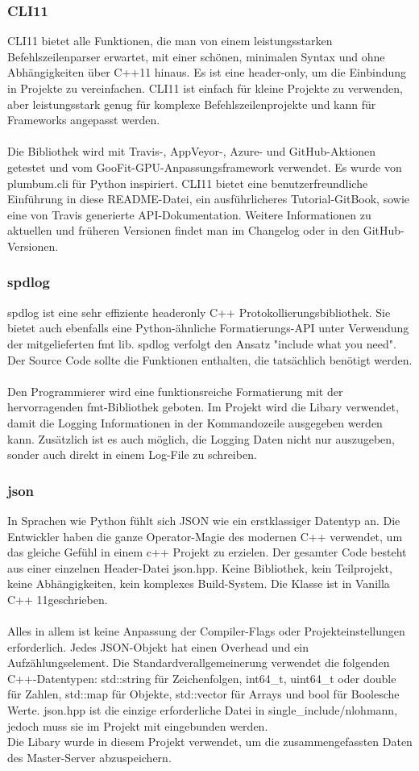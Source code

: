 \documentclass[a4paper,12pt]{article}
\begin{document}
\subsubsection{CLI11}
CLI11 bietet alle Funktionen, die man von einem leistungsstarken Befehlszeilenparser erwartet, mit einer schönen, minimalen Syntax und ohne 
Abhängigkeiten über C++11 hinaus. Es ist eine header-only, um die Einbindung in Projekte zu 
vereinfachen. CLI11 ist einfach für kleine Projekte zu verwenden, aber leistungsstark genug für komplexe Befehlszeilenprojekte und kann für Frameworks angepasst werden. \\\\
Die Bibliothek wird mit Travis-, AppVeyor-, Azure- und GitHub-Aktionen getestet und vom GooFit-GPU-Anpassungsframework verwendet. 
Es wurde von plumbum.cli für Python inspiriert. CLI11 bietet eine benutzerfreundliche Einführung in diese README-Datei, ein ausführlicheres Tutorial-GitBook, sowie eine von Travis generierte API-Dokumentation. 
Weitere Informationen zu aktuellen und früheren Versionen findet man im Changelog oder in den GitHub-Versionen.
\subsubsection{spdlog}
spdlog ist eine sehr effiziente headeronly C++ Protokollierungsbibliothek. Sie bietet auch ebenfalls eine Python-ähnliche Formatierungs-API unter Verwendung der mitgelieferten fmt lib.
spdlog verfolgt den Ansatz "include what you need". Der Source Code sollte die Funktionen enthalten, die tatsächlich benötigt werden.\\\\
Den Programmierer wird eine funktionsreiche Formatierung mit der hervorragenden fmt-Bibliothek geboten.
Im Projekt wird die Libary verwendet, damit die Logging Informationen in der Kommandozeile ausgegeben werden kann. Zusätzlich ist es auch möglich,
die Logging Daten nicht nur auszugeben, sonder auch direkt in einem Log-File zu schreiben.
\subsubsection{json}
In Sprachen wie Python fühlt sich JSON wie ein erstklassiger Datentyp an. 
Die Entwickler haben die ganze Operator-Magie des modernen C++ verwendet, um das gleiche Gefühl in einem c++ Projekt zu erzielen. 
Der gesamter Code besteht aus einer einzelnen Header-Datei json.hpp. Keine Bibliothek, kein Teilprojekt, keine Abhängigkeiten, kein komplexes Build-System. 
Die Klasse ist in Vanilla C++ 11geschrieben. \\\\
Alles in allem ist keine Anpassung der Compiler-Flags oder Projekteinstellungen erforderlich.
Jedes JSON-Objekt hat einen Overhead und ein Aufzählungselement. Die Standardverallgemeinerung verwendet die folgenden C++-Datentypen: std::string für Zeichenfolgen, int64\_t, uint64\_t oder double für Zahlen, std::map für Objekte, std::vector für Arrays und bool für Boolesche Werte. 
json.hpp ist die einzige erforderliche Datei in single\_include/nlohmann, jedoch muss sie im Projekt mit eingebunden werden. \\
Die Libary wurde in diesem Projekt verwendet, um die zusammengefassten Daten des Master-Server abzuspeichern.
\end{document}
